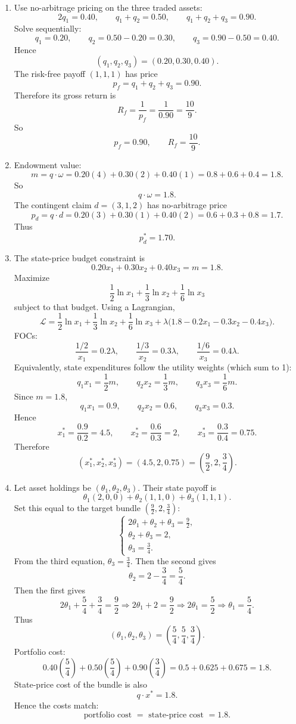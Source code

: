 \documentclass[12pt]{article}
\begin{document}
\begin{enumerate}[label=(\alph*)]
\item Use no-arbitrage pricing on the three traded assets:
\[
2q_1=0.40,\qquad q_1+q_2=0.50,\qquad q_1+q_2+q_3=0.90.
\]
Solve sequentially:
\[
q_1=0.20,
\qquad q_2=0.50-0.20=0.30,
\qquad q_3=0.90-0.50=0.40.
\]
Hence
\[
\boxed{(q_1,q_2,q_3)=(0.20,0.30,0.40).}
\]
The risk-free payoff $(1,1,1)$ has price
\[
p_f=q_1+q_2+q_3=0.90.
\]
Therefore its gross return is
\[
R_f=\frac{1}{p_f}=\frac{1}{0.90}=\frac{10}{9}.
\]
So
\[
\boxed{p_f=0.90,\qquad R_f=\frac{10}{9}.}
\]

\item Endowment value:
\[
m=q\cdot\omega = 0.20(4)+0.30(2)+0.40(1)=0.8+0.6+0.4=1.8.
\]
So
\[
\boxed{q\cdot\omega=1.8.}
\]
The contingent claim $d=(3,1,2)$ has no-arbitrage price
\[
p_d=q\cdot d = 0.20(3)+0.30(1)+0.40(2)=0.6+0.3+0.8=1.7.
\]
Thus
\[
\boxed{p_d^*=1.70.}
\]

\item The state-price budget constraint is
\[
0.20x_1+0.30x_2+0.40x_3 = m = 1.8.
\]
Maximize
\[
\frac12\ln x_1+\frac13\ln x_2+\frac16\ln x_3
\]
subject to that budget. Using a Lagrangian,
\[
\mathcal L = \frac12\ln x_1+\frac13\ln x_2+\frac16\ln x_3+\lambda\big(1.8-0.2x_1-0.3x_2-0.4x_3\big).
\]
FOCs:
\[
\frac{1/2}{x_1}=0.2\lambda,
\qquad
\frac{1/3}{x_2}=0.3\lambda,
\qquad
\frac{1/6}{x_3}=0.4\lambda.
\]
Equivalently, state expenditures follow the utility weights (which sum to 1):
\[
q_1x_1=\frac12 m,\qquad q_2x_2=\frac13 m,\qquad q_3x_3=\frac16 m.
\]
Since $m=1.8$,
\[
q_1x_1=0.9,\qquad q_2x_2=0.6,\qquad q_3x_3=0.3.
\]
Hence
\[
x_1^*=\frac{0.9}{0.2}=4.5,\qquad x_2^*=\frac{0.6}{0.3}=2,\qquad x_3^*=\frac{0.3}{0.4}=0.75.
\]
Therefore
\[
\boxed{(x_1^*,x_2^*,x_3^*)=\left(4.5,2,0.75\right)=\left(\frac92,2,\frac34\right).}
\]

\item Let asset holdings be $(\theta_1,\theta_2,\theta_3)$. Their state payoff is
\[
\theta_1(2,0,0)+\theta_2(1,1,0)+\theta_3(1,1,1).
\]
Set this equal to the target bundle $\left(\frac92,2,\frac34\right)$:
\[
\begin{cases}
2\theta_1+\theta_2+\theta_3=\frac92,\\
\theta_2+\theta_3=2,\\
\theta_3=\frac34.
\end{cases}
\]
From the third equation, $\theta_3=\frac34$.
Then the second gives
\[
\theta_2=2-\frac34=\frac54.
\]
Then the first gives
\[
2\theta_1 + \frac54+\frac34 = \frac92
\Rightarrow 2\theta_1+2=\frac92
\Rightarrow 2\theta_1=\frac52
\Rightarrow \theta_1=\frac54.
\]
Thus
\[
\boxed{(\theta_1,\theta_2,\theta_3)=\left(\frac54,\frac54,\frac34\right).}
\]
Portfolio cost:
\[
0.40\left(\frac54\right)+0.50\left(\frac54\right)+0.90\left(\frac34\right)
=0.5+0.625+0.675=1.8.
\]
State-price cost of the bundle is also
\[
q\cdot x^*=1.8.
\]
Hence the costs match:
\[
\boxed{\text{portfolio cost }=\text{ state-price cost }=1.8.}
\]


\end{enumerate}
\end{document}
